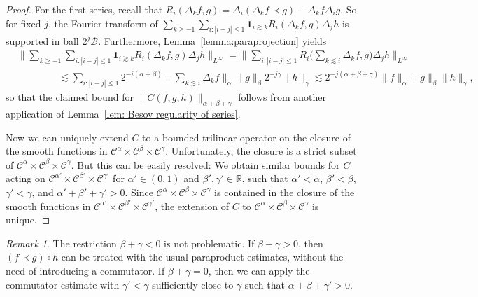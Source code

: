 \documentclass[11pt,a4paper]{article}
\theoremstyle{remark}
\newtheorem{remark}[theorem]{Remark}
\newcommand{\CB}{\ensuremath{\mathscr{B}}}
\newcommand{\CC}{\ensuremath{\mathscr{C}}}
\begin{document}
\begin{proof}
  For the first series, recall that $R_{i} ( \Delta_{k} f,g ) = \Delta_{i} ( \Delta_{k} f \prec g ) - \Delta_{k} f \Delta_{i} g$. So for fixed $j$, the
  Fourier transform of $\sum_{k \geqslant -1} \sum_{i: | i-j | \leqslant 1} \mathbf{1}_{i \gtrsim k} R_{i} ( \Delta_{k} f,g ) \Delta_{j} h$ is
  supported in ball $2^{j} \CB$. Furthermore,
  Lemma~\ref{lemma:paraprojection} yields
  \begin{align*}
     &\Bigg\| \sum_{k \geqslant -1} \sum_{i: | i-j | \leqslant 1} \mathbf{1}_{i \gtrsim k} R_{i} ( \Delta_{k} f,g ) \Delta_{j} h \Bigg\|_{L^{\infty}} = \Bigg\| \sum_{i: | i-j | \leqslant 1} R_{i}  \Bigg( \sum_{k \lesssim i} \Delta_{k} f,g \Bigg) \Delta_{j} h  \Bigg\|_{L^{\infty}} \\
     &\hspace{50pt} \lesssim \sum_{i: | i-j | \leqslant 1} 2^{-i ( \alpha + \beta )} \bigg\| \sum_{k \lesssim i} \Delta_{k} f \bigg\|_{\alpha} \| g \|_{\beta} 2^{-j \gamma} \| h \|_{\gamma} \lesssim 2^{-j ( \alpha + \beta + \gamma )} \| f \|_{\alpha} \| g \|_{\beta} \| h \|_{\gamma},
  \end{align*}
  so that the claimed bound for $\| C ( f,g,h ) \|_{\alpha + \beta + \gamma}$
  follows from another application of Lemma~\ref{lem: Besov regularity of series}.
  
  Now we can uniquely extend $C$ to a bounded trilinear operator on the
  closure of the smooth functions in $\CC^{\alpha} \times \CC^{\beta} \times \CC^{\gamma}$. Unfortunately, the closure is a strict subset of
  $\CC^{\alpha} \times \CC^{\beta} \times \CC^{\gamma}$. But this can be
  easily resolved: We obtain similar bounds for $C$ acting on $\CC^{\alpha'} \times \CC^{\beta'} \times \CC^{\gamma'}$ for $\alpha' \in ( 0,1 )$ and
  $\beta' , \gamma' \in \mathbb{R}$, such that $\alpha' < \alpha$, $\beta' < \beta$, $\gamma' < \gamma$, and $\alpha' + \beta'+ \gamma' >0$. Since
  $\CC^{\alpha} \times \CC^{\beta} \times \CC^{\gamma}$ is contained in the
  closure of the smooth functions in $\CC^{\alpha'} \times \CC^{\beta'} \times \CC^{\gamma'}$, the extension of $C$ to $\CC^{\alpha} \times \CC^{\beta} \times \CC^{\gamma}$ is unique.
\end{proof}

\begin{remark}
  The restriction $\beta + \gamma <0$ is not problematic. If $\beta + \gamma >0$, then $( f \prec g ) \circ h$ can be treated with the usual paraproduct estimates, without the need of introducing a commutator. If $\beta + \gamma =0$, then we can apply the commutator estimate with $\gamma' < \gamma$
  sufficiently close to $\gamma$ such that $\alpha + \beta + \gamma' >0$.
\end{remark}
\end{document}
